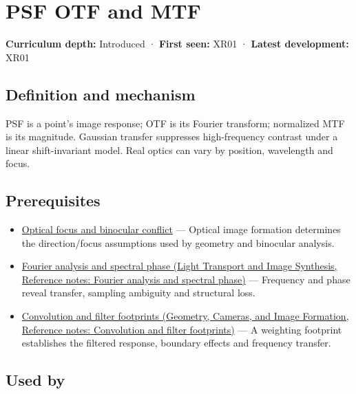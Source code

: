 \hypertarget{appendix-8b76b0efd27f}{}\label{referencestart:appendix-8b76b0efd27f}
\section{PSF OTF and MTF}\label{appendix-8b76b0efd27f-psf-otf-and-mtf}

\textbf{Curriculum depth:} Introduced · \textbf{First seen:} XR01 · \textbf{Latest development:} XR01

\subsection{Definition and mechanism}\label{appendix-8b76b0efd27f-definition-and-mechanism}

PSF is a point's image response; OTF is its Fourier transform; normalized MTF is its magnitude. Gaussian transfer suppresses high-frequency contrast under a linear shift-invariant model. Real optics can vary by position, wavelength and focus.

\subsection{Prerequisites}\label{appendix-8b76b0efd27f-prerequisites}

\begin{itemize}
\tightlist
\item
  \hyperref[appendix-f90cee1be7a4]{Optical focus and binocular conflict} --- Optical image formation determines the direction/focus assumptions used by geometry and binocular analysis.
\item
  \href{../04-Light-Transport-and-Image-Synthesis/main.pdf\#nameddest=appendix-b60686ba06a1}{Fourier analysis and spectral phase (Light Transport and Image Synthesis, Reference notes: Fourier analysis and spectral phase)} --- Frequency and phase reveal transfer, sampling ambiguity and structural loss.
\item
  \href{../03-Geometry-Cameras-and-Image-Formation/main.pdf\#nameddest=appendix-d5b3c692d9f0}{Convolution and filter footprints (Geometry, Cameras, and Image Formation, Reference notes: Convolution and filter footprints)} --- A weighting footprint establishes the filtered response, boundary effects and frequency transfer.
\end{itemize}

\subsection{Used by}\label{appendix-8b76b0efd27f-used-by}

